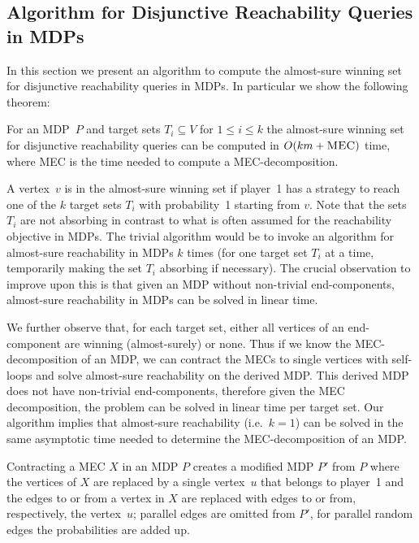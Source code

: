 \documentclass[11pt,letterpaper]{article}
\newcommand{\mdp}{P\xspace}
\newcommand{\target}{T\xspace}
\newcommand{\ec}{X\xspace}
\begin{document}
{\subsection{Algorithm for Disjunctive Reachability Queries in MDPs}
In this section we present an algorithm to compute the almost-sure winning
set for disjunctive reachability queries in MDPs. 
In particular we show the following theorem:
\begin{theorem}\label{th:timedrmdp}
	For an MDP~$\mdp$ and target sets $\target_i \subseteq V$ 
for $1 \le i \le k$ the almost-sure winning set for disjunctive reachability
queries can be computed in $O(k m + \textsc{MEC})$ time, where MEC is the time 
needed to compute a MEC-decomposition.
\end{theorem}
A vertex~$v$ is in the almost-sure winning
set if player~1 has a strategy to reach one of the $k$ target sets $\target_i$
with probability~1 starting from $v$.
Note that the sets $\target_i$ are not absorbing in contrast to what is often 
assumed for the reachability objective in MDPs. The trivial algorithm would be 
to invoke an algorithm for almost-sure reachability in MDPs $k$ times (for one 
target set $\target_i$ at a time, temporarily making the set $\target_i$ absorbing
if necessary). The 
crucial observation to improve upon this is that given an MDP without 
non-trivial end-components, almost-sure reachability in MDPs can be solved in 
linear time.

We further observe that, for each target set,
either all vertices of an end-component are winning (almost-surely) or none.
Thus if we know the MEC-decomposition of an MDP, 
we can contract the MECs 
to single vertices with self-loops and solve almost-sure reachability on the 
derived MDP. This derived MDP does not have non-trivial end-components,
therefore given the MEC decomposition, the problem can be solved in linear time
per target set. Our algorithm implies that
almost-sure reachability (i.e.\ $k=1$) can be solved in the same asymptotic 
time needed to determine the MEC-decomposition of an MDP.

\begin{definition}
	Contracting a MEC $\ec$ in an MDP $\mdp$ 
	creates a modified MDP $\mdp'$ from $\mdp$ where the vertices of $\ec$ are 
	replaced by a single vertex~$u$ that belongs to player~1 and the edges to or 
	from a vertex in $\ec$ are replaced with edges to or from, respectively, the 
	vertex~$u$; parallel edges are omitted from $P'$, for parallel random edges
	the probabilities are added up.
\end{definition}

}
\end{document}
